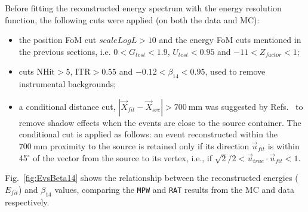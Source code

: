 Before fitting the reconstructed energy spectrum with the energy resolution function, the following cuts were applied (on both the data and MC): 

\begin{itemize}
\item the position FoM cut $scaleLogL>10$ and the energy FoM cuts mentioned in the previous sections, i.e. $0<G_{test}<1.9$, $U_{test}<0.95$ and $-11<Z_{factor}<1$;

\item cuts $\mathrm{NHit}>5$, $\mathrm{ITR}>0.55$ and $-0.12<\beta_{14}<0.95$, used to remove instrumental backgrounds;

\item a conditional distance cut, $|\vec{X}_{fit}-\vec{X}_{src}|>700~$mm was suggested by Refs.~\cite{leta,waterunidoc} to remove shadow effects when the events are close to the source container. The conditional cut is applied as follows: an event reconstructed within the $700~ \mathrm{mm}$ proximity to the source is retained only if its direction $\vec{u}_{fit}$ is within 45$^\circ$ of the vector from the source to its vertex, i.e., if $\sqrt2/2<\vec{u}_{true}\cdot \vec{u}_{fit}<1$.

\end{itemize}

Fig.~\ref{fig:EvsBeta14} shows the relationship between the reconstructed energies ($E_{fit}$) and $\beta_{14}$ values, comparing the \texttt{MPW} and \texttt{RAT} results from the MC and data respectively. 

